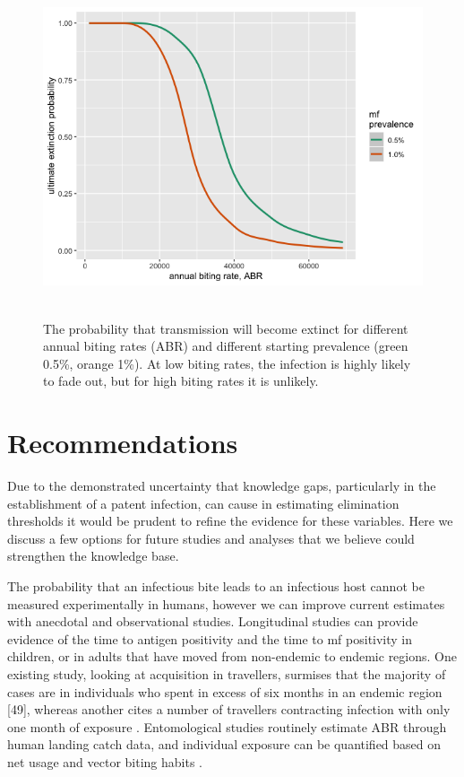 \begin{figure}
    \centering
    \includegraphics[height=10cm]{Project/Figures/LFElimination/Figure5.png}
    \caption[Extinction probability by annual biting rate (ABR).]{The probability that transmission will become extinct for different annual biting rates (ABR) and different starting prevalence (green 0.5\%, orange 1\%).  At low biting rates, the infection is highly likely to fade out, but for high biting rates it is unlikely.}
    \label{fig:Elim_5}
\end{figure}

\section{Recommendations}

Due to the demonstrated uncertainty that knowledge gaps, particularly in the establishment of a patent infection, can cause in estimating elimination thresholds it would be prudent to refine the evidence for these variables. Here we discuss a few options for future studies and analyses that we believe could strengthen the knowledge base.

The probability that an infectious bite leads to an infectious host cannot be measured experimentally in humans, however we can improve current estimates with anecdotal and observational studies. Longitudinal studies can provide evidence of the time to antigen positivity and the time to mf positivity in children, or in adults that have moved from non-endemic to endemic regions. One existing study, looking at acquisition in travellers, surmises that the majority of cases are in individuals who spent in excess of six months in an endemic region [49], whereas another cites a number of travellers contracting infection with only one month of exposure \cite{Jones2014}. Entomological studies routinely estimate ABR through human landing catch data, and individual exposure can be quantified based on net usage and vector biting habits \cite{Reimer2013_insecticidal,Thomsen2017}.

